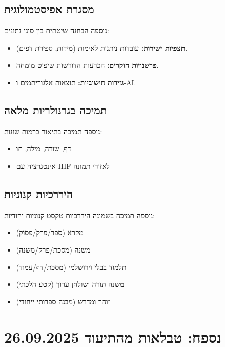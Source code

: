 \documentclass[12pt,a4paper]{article}
\newcommand{\new}[1]{\textcolor{newaddition}{#1}}
\begin{document}
\subsection{מסגרת אפיסטמולוגית}

\new{נוספה הבחנה שיטתית בין סוגי נתונים:}
\begin{itemize}
\item \new{\textbf{תצפיות ישירות:} עובדות ניתנות לאימות (מידות, ספירת דפים).}
\item \new{\textbf{פרשנויות חוקרים:} הכרעות הדורשות שיפוט מומחה.}
\item \new{\textbf{גזירות חישוביות:} תוצאות אלגוריתמים ו-AI.}
\end{itemize}

\subsection{תמיכה בגרנולריות מלאה}

\new{נוספה תמיכה בתיאור ברמות שונות:}
\begin{itemize}
\item \new{דף, שורה, מילה, תו}
\item \new{אינטגרציה עם IIIF לאזורי תמונה}
\end{itemize}

\subsection{היררכיות קנוניות}

\new{נוספה תמיכה בשמונה היררכיות טקסט קנוניות יהודיות:}
\begin{itemize}
\item \new{מקרא (ספר/פרק/פסוק)}
\item \new{משנה (מסכת/פרק/משנה)}
\item \new{תלמוד בבלי וירושלמי (מסכת/דף/עמוד)}
\item \new{משנה תורה ושולחן ערוך (קטע הלכתי)}
\item \new{זוהר ומדרש (מבנה ספרותי ייחודי)}
\end{itemize}

\newpage

\section{נספח: טבלאות מהתיעוד 26.09.2025}
\end{document}
